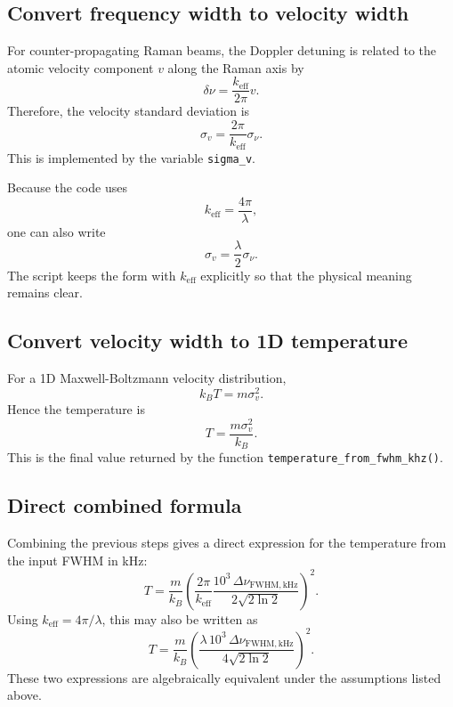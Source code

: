 \documentclass[11pt]{article}
\begin{document}
\subsection{Convert frequency width to velocity width}
For counter-propagating Raman beams, the Doppler detuning is related to the atomic velocity component $v$ along the Raman axis by
\begin{equation}
\delta \nu = \frac{k_{\mathrm{eff}}}{2\pi}v.
\end{equation}
Therefore, the velocity standard deviation is
\begin{equation}
\sigma_v = \frac{2\pi}{k_{\mathrm{eff}}}\sigma_\nu.
\end{equation}
This is implemented by the variable \texttt{sigma\_v}.

Because the code uses
\begin{equation}
 k_{\mathrm{eff}} = \frac{4\pi}{\lambda},
\end{equation}
one can also write
\begin{equation}
\sigma_v = \frac{\lambda}{2}\sigma_\nu.
\end{equation}
The script keeps the form with $k_{\mathrm{eff}}$ explicitly so that the physical meaning remains clear.

\subsection{Convert velocity width to 1D temperature}
For a 1D Maxwell-Boltzmann velocity distribution,
\begin{equation}
 k_B T = m\sigma_v^2.
\end{equation}
Hence the temperature is
\begin{equation}
T = \frac{m\sigma_v^2}{k_B}.
\end{equation}
This is the final value returned by the function \texttt{temperature\_from\_fwhm\_khz()}.

\subsection{Direct combined formula}
Combining the previous steps gives a direct expression for the temperature from the input FWHM in kHz:
\begin{equation}
T = \frac{m}{k_B}\left(\frac{2\pi}{k_{\mathrm{eff}}}\frac{10^3\,\Delta \nu_{\mathrm{FWHM,kHz}}}{2\sqrt{2\ln 2}}\right)^2.
\end{equation}
Using $k_{\mathrm{eff}} = 4\pi/\lambda$, this may also be written as
\begin{equation}
T = \frac{m}{k_B}\left(\frac{\lambda\,10^3\,\Delta \nu_{\mathrm{FWHM,kHz}}}{4\sqrt{2\ln 2}}\right)^2.
\end{equation}
These two expressions are algebraically equivalent under the assumptions listed above.
\end{document}
